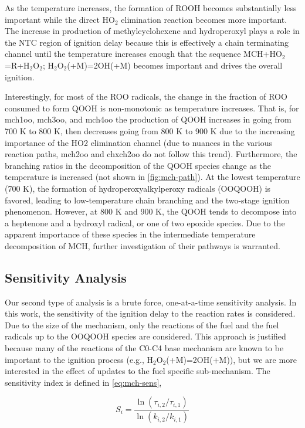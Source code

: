 \documentclass[12pt, letterpaper]{article}
\begin{document}
As the temperature increases, the formation of ROOH becomes substantially less
important while the direct HO$_2$ elimination reaction becomes more important.
The increase in production of methylcyclohexene and hydroperoxyl plays a role
in the NTC region of ignition delay because this is effectively a chain
terminating channel until the temperature increases enough that the sequence
MCH+HO$_2$=R+H$_2$O$_2$; H$_2$O$_2$(+M)=2OH(+M) becomes important and drives
the overall ignition.

Interestingly, for most of the ROO radicals, the change in the fraction of ROO
consumed to form QOOH is non-monotonic as temperature increases. That is, for
mch1oo, mch3oo, and mch4oo the production of QOOH increases in going from 700 K
to 800 K, then decreases going from 800 K to 900 K due to the increasing
importance of the HO2 elimination channel (due to nuances in the various
reaction paths, mch2oo and chxch2oo do not follow this trend). Furthermore,
the branching ratios in the decomposition of the QOOH species change as the
temperature is increased (not shown in \autoref{fig:mch-path}). At the lowest
temperature (700 K), the formation of hydroperoxyalkylperoxy radicals (OOQOOH)
is favored, leading to low-temperature chain branching and the two-stage
ignition phenomenon. However, at 800 K and 900 K, the QOOH tends to decompose
into a heptenone and a hydroxyl radical, or one of two epoxide species. Due to
the apparent importance of these species in the intermediate temperature
decomposition of MCH, further investigation of their pathways is warranted.

\subsection{Sensitivity Analysis}
\label{sec:sensitivity-analysis}

Our second type of analysis is a brute force, one-at-a-time sensitivity
analysis. In this work, the sensitivity of the ignition delay to the reaction
rates is considered. Due to the size of the mechanism, only the reactions of
the fuel and the fuel radicals up to the OOQOOH species are considered. This
approach is justified because many of the reactions of the C0-C4 base
mechanism are known to be important to the ignition process (e.g.,
H$_2$O$_2$(+M)=2OH(+M)), but we are more interested in the effect of updates to
the fuel specific sub-mechanism. The sensitivity index is defined in
\autoref{eq:mch-sens},

\begin{equation}
    \label{eq:mch-sens}
    S_i = \frac{\ln\left(\tau_{i,2}/\tau_{i,1}\right)}{\ln\left(k_{i,2}/k_{i,1}\right)}
\end{equation}
\end{document}
